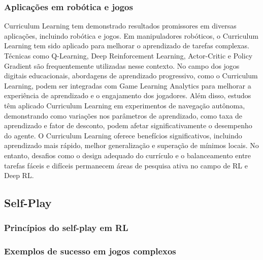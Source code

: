 \subsubsection{Aplicações em robótica e jogos}
\label{subsubsec:curriculum_aplicacoes}

Curriculum Learning tem demonstrado resultados promissores em diversas aplicações, incluindo robótica e jogos. Em manipuladores robóticos, o Curriculum Learning tem sido aplicado para melhorar o aprendizado de tarefas complexas. Técnicas como Q-Learning, Deep Reinforcement Learning, Actor-Critic e Policy Gradient são frequentemente utilizadas nesse contexto\cite{https://www.semanticscholar.org/paper/f11594e47ce3f5872bd4d4868f23655025bb6511}. No campo dos jogos digitais educacionais, abordagens de aprendizado progressivo, como o Curriculum Learning, podem ser integradas com Game Learning Analytics para melhorar a experiência de aprendizado e o engajamento dos jogadores\cite{https://www.semanticscholar.org/paper/704147ceaed752c17e5f24f9a3521c41cbfc9ff7}. Além disso, estudos têm aplicado Curriculum Learning em experimentos de navegação autônoma, demonstrando como variações nos parâmetros de aprendizado, como taxa de aprendizado e fator de desconto, podem afetar significativamente o desempenho do agente\cite{https://www.semanticscholar.org/paper/79d92c9a3e0de40d863e43232e2c00370412a841}. O Curriculum Learning oferece benefícios significativos, incluindo aprendizado mais rápido, melhor generalização e superação de mínimos locais. No entanto, desafios como o design adequado do currículo e o balanceamento entre tarefas fáceis e difíceis permanecem áreas de pesquisa ativa no campo de RL e Deep RL.

\subsection{Self-Play}
\label{subsec:self_play}

\subsubsection{Princípios do self-play em RL}
\label{subsubsec:self_play_principios}


\subsubsection{Exemplos de sucesso em jogos complexos}
\label{subsubsec:self_play_exemplos}

